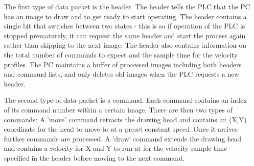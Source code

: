 The first type of data packet is the header. The header tells the PLC that the PC has an image to draw and to get ready to start operating. The header contains a single bit that switches between two states - this is so if operation of the PLC is stopped prematurely, it can request the same header and start the process again rather than skipping to the next image. The header also contains information on the total number of commands to expect and the sample time for the velocity profiles. The PC maintains a buffer of processed images including both headers and command lists, and only deletes old images when the PLC requests a new header.

The second type of data packet is a command. Each command contains an index of its command number within a certain image. There are then two types of commands: A 'move' command retracts the drawing head and contains an (X,Y) coordinate for the head to move to at a preset constant speed. Once it arrives further commands are processed. A 'draw' command extends the drawing head and contains a velocity for X and Y to run at for the velocity sample time specified in the header before moving to the next command.